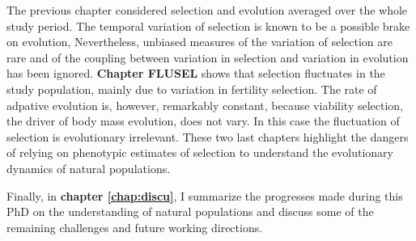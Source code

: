 The previous chapter considered selection and evolution averaged over the whole study period. The temporal variation of selection is known to be a possible brake on evolution, 
Nevertheless, unbiased measures of the variation of selection are rare and of the coupling between variation in selection and variation in evolution has been ignored. \textbf{Chapter FLUSEL} shows that selection fluctuates in the study population, mainly due to variation in fertility selection. The rate of adpative evolution is, however, remarkably constant, because viability selection, the driver of body mass evolution, does not vary. In this case the fluctuation of selection is evolutionary irrelevant. These two last chapters highlight the dangers of relying on phenotypic estimates of selection to understand the evolutionary dynamics of natural populations.

Finally, in \textbf{chapter \ref{chap:discu}}, I summarize the progresses made during this PhD on the understanding of natural populations and discuss some of the remaining challenges and future working directions.

\printbibliography[heading=subbibliography]

